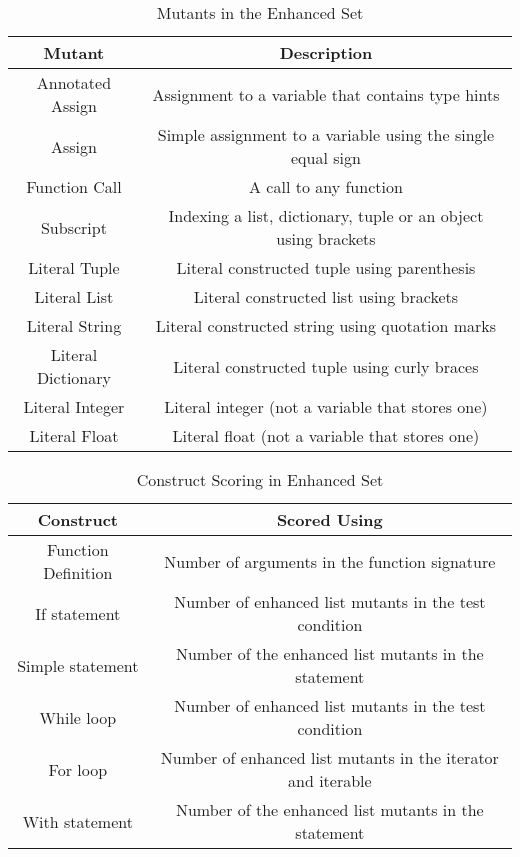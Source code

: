 \begin{table}[!htb]
	\centering
	\begin{tabular}{|c|c|}
	 \hline
	 Mutant & Description \\
	 \hline
	 Annotated Assign & Assignment to a variable that contains type hints \\
	 Assign & Simple assignment to a variable using the single equal sign  \\
	 Function Call & A call to any function \\
	 Subscript & Indexing a list, dictionary, tuple or an object using brackets \\
	 Literal Tuple & Literal constructed tuple using parenthesis \\
	 Literal List & Literal constructed list using brackets \\
	 Literal String &  Literal constructed string using quotation marks \\
	 Literal Dictionary &  Literal constructed tuple using curly braces \\
	 Literal Integer &  Literal integer (not a variable that stores one) \\
	 Literal Float &  Literal float (not a variable that stores one) \\

	 \hline
	\end{tabular}
	\caption{Mutants in the Enhanced Set}
	\label{table:enhanced_set_mutants}
\end{table}

\begin{table}[!htb]
	\centering
	\begin{tabular}{|c|c|}
	 \hline
	 Construct & Scored Using \\
	 \hline
	 Function Definition & Number of arguments in the function signature \\
	 If statement & Number of enhanced list mutants in the test condition  \\
	 Simple statement & Number of the enhanced list mutants in the statement \\
	 While loop & Number of enhanced list mutants in the test condition \\
	 For loop & Number of enhanced list mutants in the iterator and iterable \\
	 With statement & Number of the enhanced list mutants in the statement \\

	 \hline
	\end{tabular}
	\caption{Construct Scoring in Enhanced Set}
	\label{table:construct_scoring}
\end{table}


